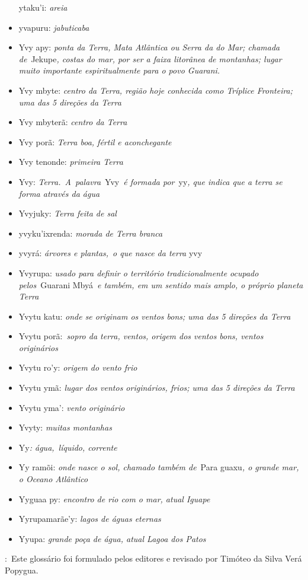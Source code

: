 \begin{itemize}
  ytaku'i: \emph{areia}
\item
  yvapuru: \emph{jabuticaba}
\item
  Yvy apy: \emph{ponta da Terra, Mata Atlântica ou Serra da do Mar;
  chamada de}~Jekupe\emph{, costas do mar, por ser a faixa litorânea de
  montanhas; lugar muito importante espiritualmente para o povo
  Guarani.}~
\item
  Yvy mbyte: \emph{centro da Terra, região hoje conhecida como Tríplice
  Fronteira; uma das 5 direções da Terra}
\item
  Yvy mbyterã: \emph{centro da Terra}
\item
  Yvy porã: \emph{Terra boa, fértil e aconchegante}
\item
  Yvy tenonde: \emph{primeira Terra}
\item
  Yvy: \emph{Terra.}~\emph{A~palavra}~Yvy~\emph{é formada por}~yy\emph{,
  que indica que a terra se forma através da água}
\item
  Yvyjuky: \emph{Terra feita de sal}
\item
  yvyku'ixrenda: \emph{morada de Terra branca}
\item
  yvyrá: \emph{árvores e plantas,}~\emph{o que nasce da terra} yvy
\item
  Yvyrupa: \emph{usado para definir o território tradicionalmente
  ocupado pelos}~Guarani Mbyá~\emph{e também, em um sentido mais amplo,
  o próprio planeta Terra}
\item
  Yvytu katu: \emph{onde se originam os ventos bons; uma das 5 direções
  da Terra}
\item
  Yvytu porã:~\emph{sopro da terra, ventos, origem dos ventos bons,
  ventos originários}
\item
  Yvytu ro'y: \emph{origem do vento frio}
\item
  Yvytu ymã: \emph{lugar dos ventos originários, frios; uma das 5
  direções da Terra}
\item
  Yvytu yma': \emph{vento originário}
\item
  Yvyty: \emph{muitas montanhas}
\item
  Yy\emph{: água,}~\emph{líquido, corrente}
\item
  Yy ramõi: \emph{onde nasce o sol, chamado também de}~Para guaxu\emph{,
  o grande mar, o Oceano Atlântico}
\item
  Yyguaa py: \emph{encontro de rio com o mar, atual Iguape}
\item
  Yyrupamarãe'y: \emph{lagos de águas eternas}
\item
  Yyupa: \emph{grande poça de água, atual Lagoa dos Patos}
\end{itemize}

\emph{​}:~Este glossário foi formulado pelos editores e revisado por
Timóteo da Silva Verá Popygua.
